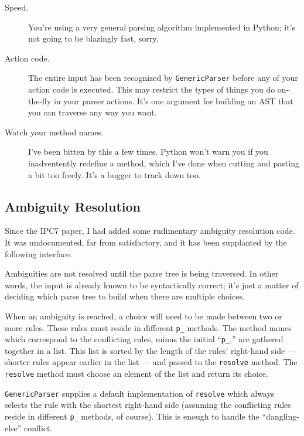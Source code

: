 \documentclass{article}
\newcommand{\code}[1]{\texttt{#1}}
\begin{document}
\begin{description}

\item[Speed.] You're using a very general parsing algorithm
	implemented in Python; it's not going to be blazingly fast,
	sorry.

\item[Action code.]  The entire input has been recognized by
	\code{GenericParser} before any of your action code is
	executed.  This may restrict the types of things you do on-the-fly
	in your parser actions.  It's one argument for building an AST
	that you can traverse any way you want.

\item[Watch your method names.]  I've been bitten by this a few times.
	Python won't warn you if you inadventently redefine a method,
	which I've done when cutting and pasting a bit too freely.  It's
	a bugger to track down too.

\end{description}

\subsection{Ambiguity Resolution}

Since the IPC7 paper, I had added some rudimentary ambiguity resolution code.
It was undocumented, far from satisfactory, and it has been supplanted by
the following interface.

Ambiguities are not resolved until the parse tree is being traversed.  In
other words, the input is already known to be syntactically correct; it's
just a matter of deciding which parse tree to build when there are multiple
choices.

When an ambiguity is reached, a choice will need to be made between two
or more rules.  These rules must reside in different \code{p\_} methods.
The method names which correspond to the conflicting rules, minus the
initial ``\code{p\_},'' are gathered together in a list.  This list is
sorted by the length of the rules' right-hand side --- shorter rules appear
earlier in the list --- and passed to the \code{resolve} method.  The
\code{resolve} method must choose an element of the list and return its choice.

\code{GenericParser} supplies a default implementation of \code{resolve}
which always selects the rule with the shortest right-hand side (assuming
the conflicting rules reside in different \code{p\_} methods, of course).
This is enough to handle the ``dangling-else'' conflict.
\end{document}
